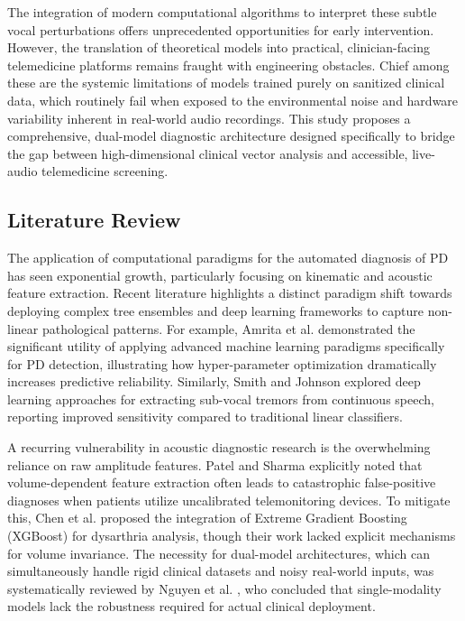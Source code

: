 \documentclass[conference]{IEEEtran}
\begin{document}
The integration of modern computational algorithms to interpret these subtle vocal perturbations offers unprecedented opportunities for early intervention. However, the translation of theoretical models into practical, clinician-facing telemedicine platforms remains fraught with engineering obstacles. Chief among these are the systemic limitations of models trained purely on sanitized clinical data, which routinely fail when exposed to the environmental noise and hardware variability inherent in real-world audio recordings. This study proposes a comprehensive, dual-model diagnostic architecture designed specifically to bridge the gap between high-dimensional clinical vector analysis and accessible, live-audio telemedicine screening. 

\subsection{Literature Review}
The application of computational paradigms for the automated diagnosis of PD has seen exponential growth, particularly focusing on kinematic and acoustic feature extraction. Recent literature highlights a distinct paradigm shift towards deploying complex tree ensembles and deep learning frameworks to capture non-linear pathological patterns. For example, Amrita et al. \cite{amrita2025machine} demonstrated the significant utility of applying advanced machine learning paradigms specifically for PD detection, illustrating how hyper-parameter optimization dramatically increases predictive reliability. Similarly, Smith and Johnson \cite{smith2023deep} explored deep learning approaches for extracting sub-vocal tremors from continuous speech, reporting improved sensitivity compared to traditional linear classifiers. 

A recurring vulnerability in acoustic diagnostic research is the overwhelming reliance on raw amplitude features. Patel and Sharma \cite{patel2024volume} explicitly noted that volume-dependent feature extraction often leads to catastrophic false-positive diagnoses when patients utilize uncalibrated telemonitoring devices. To mitigate this, Chen et al. \cite{chen2023acoustic} proposed the integration of Extreme Gradient Boosting (XGBoost) for dysarthria analysis, though their work lacked explicit mechanisms for volume invariance. The necessity for dual-model architectures, which can simultaneously handle rigid clinical datasets and noisy real-world inputs, was systematically reviewed by Nguyen et al. \cite{nguyen2024dual}, who concluded that single-modality models lack the robustness required for actual clinical deployment.
\end{document}
